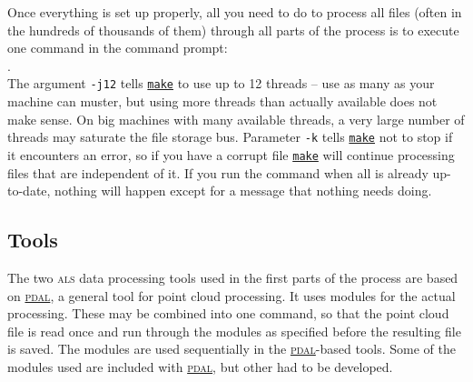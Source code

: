 \documentclass[english,a4paper,minion,nofigsidecaption]{article}
\newcommand{\als}{\textsc{als}}
\newcommand{\make}{\href{https://www.gnu.org/software/make/}{\texttt{make}}}
\newcommand{\pdal}{\href{https://www.pdal.io}{\textsc{pdal}}}
\begin{document}
Once everything is set up properly, all you need to do to process all files (often in the hundreds of thousands of them) through all parts of the process is to execute one command in the command prompt:
\\[0.25em].
\\[0.25em]The argument \texttt{-j12} tells {\make} to use up to 12 threads – use as many as your machine can muster, but using more threads than actually available does not make sense. On big machines with many available threads, a very large number of threads may saturate the file storage bus. Parameter \texttt{-k} tells {\make} not to stop if it encounters an error, so if you have a corrupt file {\make} will continue processing files that are independent of it. If you run the command when all is already up-to-date, nothing will happen except for a message that nothing needs doing. 

\subsection{Tools}

The two {\als} data processing tools used in the first parts of the process are based on {\pdal}, a general tool for point cloud processing. It uses modules for the actual processing. These may be combined into one command, so that the point cloud file is read once and run through the modules as specified before the resulting file is saved. The modules are used sequentially in the {\pdal}-based tools. Some of the modules used are included with {\pdal}, but other had to be developed. 
\end{document}
